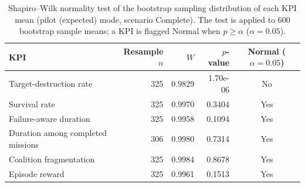 \begin{table}[htbp]
  \centering
  \caption{Shapiro--Wilk normality test of the bootstrap sampling distribution of each KPI mean (pilot (expected) mode, scenario Complete). The test is applied to 600 bootstrap sample means; a KPI is flagged Normal when $p \geq \alpha$ ($\alpha=0.05$).}
  \label{tab:normality_Complete_pilot}
  \begin{tabular}{lrrrc}
    \toprule
    KPI & Resample $n$ & $W$ & $p$-value & Normal ($\alpha=0.05$) \\
    \midrule
    Target-destruction rate & 325 & 0.9829 & 1.70e-06 & No \\
    Survival rate & 325 & 0.9970 & 0.3404 & Yes \\
    Failure-aware duration & 325 & 0.9958 & 0.1094 & Yes \\
    Duration among completed missions & 306 & 0.9980 & 0.7314 & Yes \\
    Coalition fragmentation & 325 & 0.9984 & 0.8678 & Yes \\
    Episode reward & 325 & 0.9961 & 0.1513 & Yes \\
    \bottomrule
  \end{tabular}
\end{table}
